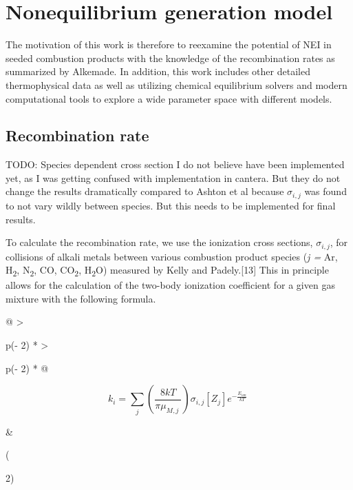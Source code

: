 
\hypertarget{nonequilibrium-generation-model}{%
\section{Nonequilibrium generation model}\label{nonequilibrium-generation-model}}

The motivation of this work is therefore to reexamine the potential of NEI in seeded combustion products with the knowledge of the recombination rates as summarized by Alkemade. In addition, this work includes other detailed thermophysical data as well as utilizing chemical equilibrium solvers and modern computational tools to explore a wide parameter space with different models.

\hypertarget{recombination-rate}{%
\subsection{Recombination rate}\label{recombination-rate}}

TODO: Species dependent cross section I do not believe have been implemented yet, as I was getting confused with implementation in cantera. But they do not change the results dramatically compared to Ashton et al because \(\sigma_{i,j}\) was found to not vary wildly between species. But this needs to be implemented for final results.

To calculate the recombination rate, we use the ionization cross sections, \(\sigma_{i,j}\), for collisions of alkali metals between various combustion product species (\emph{j =} Ar, H\textsubscript{2}, N\textsubscript{2}, CO, CO\textsubscript{2}, H\textsubscript{2}O) measured by Kelly and Padely.{[}13{]} This in principle allows for the calculation of the two-body ionization coefficient for a given gas mixture with the following formula.

\begin{longtable}[]{@{}
  >{\raggedright\arraybackslash}p{(\columnwidth - 2\tabcolsep) * }
  >{\raggedright\arraybackslash}p{(\columnwidth - 2\tabcolsep) * }@{}}
\toprule
\begin{minipage}[b]{\linewidth}\raggedright
\[k_{i} = \sum_{j}^{}{\left( \frac{8kT}{\pi\mu_{M,j}\ } \right)\sigma_{i,j}\left\lbrack Z_{j} \right\rbrack e^{- \frac{E_{ion}}{kT}}\ }\]
\end{minipage} & \begin{minipage}[b]{\linewidth}\raggedright
(

2)
\end{minipage} \\
\midrule
\endhead
\bottomrule
\end{longtable}

